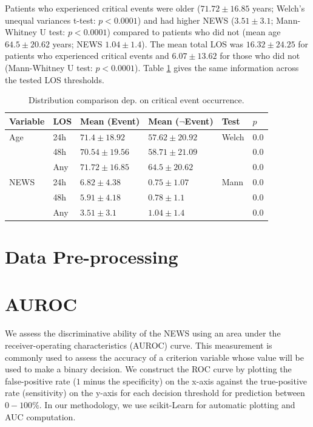 \documentclass[10pt,journal,compsoc]{IEEEtran}
\begin{document}
Patients who experienced critical events were older ($71.72 \pm 16.85$ years; Welch's unequal variances t-test: $p < 0.0001$) and had higher NEWS ($3.51 \pm 3.1$; Mann-Whitney U test: $p < 0.0001$) compared to patients who did not (mean age $64.5 \pm 20.62$ years; NEWS $1.04 \pm 1.4$). The mean total LOS was $16.32 \pm 24.25$ for patients who experienced critical events and $6.07 \pm 13.62$ for those who did not (Mann-Whitney U test: $p < 0.0001$). Table \ref{tab:criticalevent_stats} gives the same information across the tested LOS thresholds.

\begin{table}[!t]
    \renewcommand{\arraystretch}{1.3}
    \centering
    \caption{Distribution comparison dep. on critical event occurrence.}
    \label{tab:criticalevent_stats}
    \begin{tabular}{l l l l l l}
        \hline\hline
        Variable & LOS & Mean (Event)      & Mean ($\lnot$Event) & Test  & $p$   \\
        \hline
        Age      & 24h & $71.4 \pm 18.92$  & $57.62 \pm 20.92$   & Welch & $0.0$ \\
                 & 48h & $70.54 \pm 19.56$ & $58.71 \pm 21.09$   &       & $0.0$ \\
                 & Any & $71.72 \pm 16.85$ & $64.5 \pm 20.62$    &       & $0.0$ \\
        NEWS     & 24h & $6.82 \pm 4.38$   & $0.75 \pm 1.07$     & Mann  & $0.0$ \\
                 & 48h & $5.91 \pm 4.18$   & $0.78 \pm 1.1$      &       & $0.0$ \\
                 & Any & $3.51 \pm 3.1$    & $1.04 \pm 1.4$      &       & $0.0$ \\
        \hline\hline
    \end{tabular}
\end{table}

\onecolumn
\appendices

\section{Data Pre-processing}
\label{appendix:preprocessing}

\section{AUROC}
\label{appendix:auroc}
We assess the discriminative ability of the NEWS using an area under the receiver-operating characteristics (AUROC) curve. This measurement is commonly used to assess the accuracy of a criterion variable whose value will be used to make a binary decision. We construct the ROC curve by plotting the false-positive rate ($1$ minus the specificity) on the x-axis against the true-positive rate (sensitivity) on the y-axis for each decision threshold for prediction between $0-100\%$. In our methodology, we use scikit-Learn for automatic plotting and AUC computation.
\end{document}
